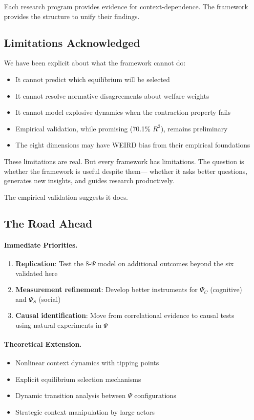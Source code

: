 Each research program provides evidence for context-dependence. The framework provides the structure to unify their findings.

\subsection{Limitations Acknowledged}

We have been explicit about what the framework cannot do:
\begin{itemize}
  \item It cannot predict which equilibrium will be selected
  \item It cannot resolve normative disagreements about welfare weights
  \item It cannot model explosive dynamics when the contraction property fails
  \item Empirical validation, while promising (70.1\% $R^2$), remains preliminary
  \item The eight dimensions may have WEIRD bias from their empirical foundations
\end{itemize}

These limitations are real. But every framework has limitations.
The question is whether the framework is useful despite them---
whether it asks better questions, generates new insights, and guides research productively.

The empirical validation suggests it does.

\subsection{The Road Ahead}

\paragraph{Immediate Priorities.}
\begin{enumerate}
    \item \textbf{Replication}: Test the 8-$\Psi$ model on additional outcomes beyond the six validated here
    \item \textbf{Measurement refinement}: Develop better instruments for $\Psi_C$ (cognitive) and $\Psi_S$ (social)
    \item \textbf{Causal identification}: Move from correlational evidence to causal tests using natural experiments in $\Psi$
\end{enumerate}

\paragraph{Theoretical Extension.}
\begin{itemize}
  \item Nonlinear context dynamics with tipping points
  \item Explicit equilibrium selection mechanisms
  \item Dynamic transition analysis between $\Psi$ configurations
  \item Strategic context manipulation by large actors
\end{itemize}

